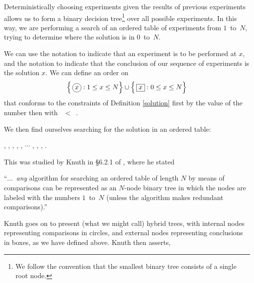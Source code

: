 \documentclass[12pt]{amsart}
\theoremstyle{definition}
\theoremstyle{theorem}
\newcommand*\circled[1]{\tikz[baseline=(char.base)]{            \node[circle,draw,inner sep=2pt] (char) {#1};}}
\begin{document}
Deterministically choosing experiments given the results of previous experiments allows us to form a 
binary decision tree\footnote{We follow the convention that the smallest binary tree consists of a single root node.}
 over all possible experiments. In this way, we are performing a search of an ordered table of experiments from \mbox{$1$ to $N$}, trying to determine where the solution is in \mbox{$0$ to $N$}. 

We can use the notation \circled{$x$} to indicate that an experiment 
is to be performed at $x$, and the notation  to indicate that the conclusion of our sequence of experiments is the solution $x$. 
We can define an order on 
$$
\Big\{ \, \circled{$x$}: 1\leq x\leq N\Big\} \cup \Big\{ \,\fbox{$x$} : 0\leq x\leq N\Big\} 
$$
that 
conforms to the constraints of Definition \ref{solution} first by the value of the number then with 
\mbox{\circled{$x$} $<$ }. 

We then find ourselves searching for the solution in an ordered table: 
\begin{center}
    , \circled{$1$}  ,   , \circled{$2$},  , $\cdots $ ,   , \circled{$N$}, .
\end{center}
This was studied by Knuth in \S 6.2.1 of \cite{knuth1998art3}, where he stated
\begin{displayquote}
``$\dots$\ \textit{any} algorithm for searching an ordered table of length $N$ by means of comparisons can be represented as an $N$-node binary tree in which the nodes are labeled with the numbers \mbox{$1$ to $N$} (unless the algorithm makes redundant comparisons).''
\end{displayquote}

Knuth goes on to present (what we might call) hybrid trees, with internal nodes representing comparisons in circles, and external nodes representing conclusions in boxes, as we have defined 
above.
Knuth then asserts, 
\end{document}
